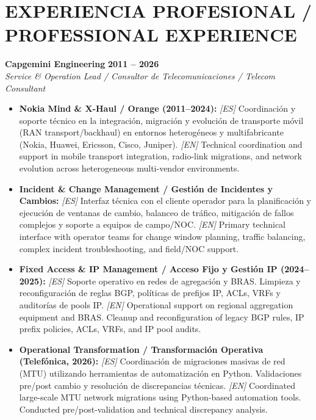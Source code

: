 \section*{EXPERIENCIA PROFESIONAL / PROFESSIONAL EXPERIENCE}

\noindent \textbf{Capgemini Engineering} \hfill \textbf{2011 -- 2026}\\
\textit{Service \& Operation Lead / Consultor de Telecomunicaciones / Telecom Consultant}
\begin{itemize}
    \item \textbf{Nokia Mind \& X-Haul / Orange (2011--2024):} 
    \newline \textit{[ES]} Coordinación y soporte técnico en la integración, migración y evolución de transporte móvil (RAN transport/backhaul) en entornos heterogéneos y multifabricante (Nokia, Huawei, Ericsson, Cisco, Juniper).
    \newline \textit{[EN]} Technical coordination and support in mobile transport integration, radio-link migrations, and network evolution across heterogeneous multi-vendor environments.
    
    \item \textbf{Incident \& Change Management / Gestión de Incidentes y Cambios:} 
    \newline \textit{[ES]} Interfaz técnica con el cliente operador para la planificación y ejecución de ventanas de cambio, balanceo de tráfico, mitigación de fallos complejos y soporte a equipos de campo/NOC.
    \newline \textit{[EN]} Primary technical interface with operator teams for change window planning, traffic balancing, complex incident troubleshooting, and field/NOC support.
    
    \item \textbf{Fixed Access & IP Management / Acceso Fijo y Gestión IP (2024--2025):} 
    \newline \textit{[ES]} Soporte operativo en redes de agregación y BRAS. Limpieza y reconfiguración de reglas BGP, políticas de prefijos IP, ACLs, VRFs y auditorías de pools IP.
    \newline \textit{[EN]} Operational support on regional aggregation equipment and BRAS. Cleanup and reconfiguration of legacy BGP rules, IP prefix policies, ACLs, VRFs, and IP pool audits.
    
    \item \textbf{Operational Transformation / Transformación Operativa (Telefónica, 2026):} 
    \newline \textit{[ES]} Coordinación de migraciones masivas de red (MTU) utilizando herramientas de automatización en Python. Validaciones pre/post cambio y resolución de discrepancias técnicas.
    \newline \textit{[EN]} Coordinated large-scale MTU network migrations using Python-based automation tools. Conducted pre/post-validation and technical discrepancy analysis.
\end{itemize}

